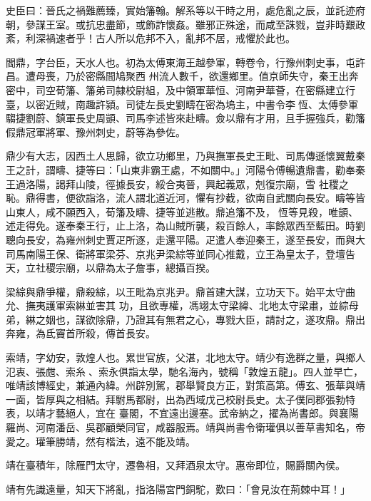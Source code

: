 \begin{pinyinscope}
 史臣曰：晉氏之禍難薦臻，實始籓翰。解系等以干時之用，處危亂之辰，並託迹府朝，參謀王室。或抗忠盡節，或飾詐懷姦。雖邪正殊途，而咸至誅戮，豈非時艱政紊，利深禍速者乎！古人所以危邦不入，亂邦不居，戒懼於此也。



 閻鼎，字台臣，天水人也。初為太傅東海王越參軍，轉卷令，行豫州刺史事，屯許昌。遭母喪，乃於密縣間鳩聚西
 州流人數千，欲還鄉里。值京師失守，秦王出奔密中，司空荀籓、籓弟司隸校尉組，及中領軍華恒、河南尹華薈，在密縣建立行臺，以密近賊，南趣許潁。司徒左長史劉疇在密為塢主，中書令李恆、太傅參軍騶捷劉蔚、鎮軍長史周顗、司馬李述皆來赴疇。僉以鼎有才用，且手握強兵，勸籓假鼎冠軍將軍、豫州刺史，蔚等為參佐。



 鼎少有大志，因西土人思歸，欲立功鄉里，乃與撫軍長史王毗、司馬傳遜懷翼戴秦王之計，謂疇、捷等曰：「山東非霸王處，不如關中。」河陽令傅暢遺鼎書，勸奉秦王過洛陽，謁拜山陵，徑據長安，綏合夷晉，興起義眾，剋復宗廟，雪
 社稷之恥。鼎得書，便欲詣洛，流人謂北道近河，懼有抄截，欲南自武關向長安。疇等皆山東人，咸不願西入，荀籓及疇、捷等並逃散。鼎追籓不及，恆等見殺，唯顗、述走得免。遂奉秦王行，止上洛，為山賊所襲，殺百餘人，率餘眾西至藍田。時劉聰向長安，為雍州刺史賈疋所逐，走還平陽。疋遣人奉迎秦王，遂至長安，而與大司馬南陽王保、衛將軍梁芬、京兆尹梁綜等並同心推戴，立王為皇太子，登壇告天，立社稷宗廟，以鼎為太子詹事，總攝百揆。



 梁綜與鼎爭權，鼎殺綜，以王毗為京兆尹。鼎首建大謀，立功天下。始平太守曲允、撫夷護軍索綝並害其
 功，且欲專權，馮翊太守梁緯、北地太守梁肅，並綜母弟，綝之姻也，謀欲除鼎，乃證其有無君之心，專戮大臣，請討之，遂攻鼎。鼎出奔雍，為氐竇首所殺，傳首長安。



 索靖，字幼安，敦煌人也。累世官族，父湛，北地太守。靖少有逸群之量，與鄉人氾衷、張甝、索糸、索永俱詣太學，馳名海內，號稱「敦煌五龍」。四人並早亡，唯靖該博經史，兼通內緯。州辟別駕，郡舉賢良方正，對策高第。傅玄、張華與靖一面，皆厚與之相結。拜駙馬都尉，出為西域戊己校尉長史。太子僕同郡張勃特表，以靖才藝絕人，宜在
 臺閣，不宜遠出邊塞。武帝納之，擢為尚書郎。與襄陽羅尚、河南潘岳、吳郡顧榮同官，咸器服焉。靖與尚書令衛瓘俱以善草書知名，帝愛之。瓘筆勝靖，然有楷法，遠不能及靖。



 靖在臺積年，除雁門太守，遷魯相，又拜酒泉太守。惠帝即位，賜爵關內侯。



 靖有先識遠量，知天下將亂，指洛陽宮門銅駝，歎曰：「會見汝在荊棘中耳！」




\end{pinyinscope}
